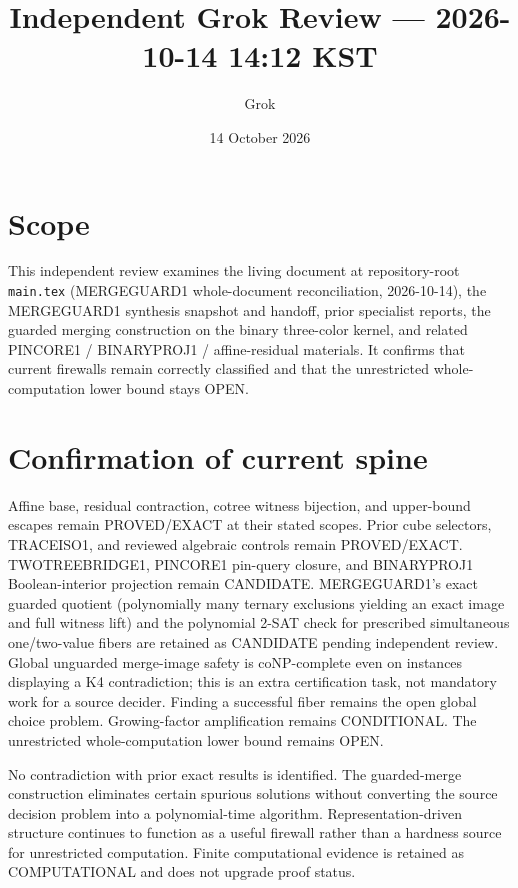 \documentclass[11pt]{article}
\title{Independent Grok Review --- 2026-10-14 14:12 KST}
\author{Grok}
\date{14 October 2026}
\begin{document}
\maketitle

\begin{center}
\end{center}

\section{Scope}
This independent review examines the living document at repository-root \texttt{main.tex} (MERGEGUARD1 whole-document reconciliation, 2026-10-14), the MERGEGUARD1 synthesis snapshot and handoff, prior specialist reports, the guarded merging construction on the binary three-color kernel, and related PINCORE1 / BINARYPROJ1 / affine-residual materials. It confirms that current firewalls remain correctly classified and that the unrestricted whole-computation lower bound stays OPEN.

\section{Confirmation of current spine}
Affine base, residual contraction, cotree witness bijection, and upper-bound escapes remain PROVED/EXACT at their stated scopes. Prior cube selectors, TRACEISO1, and reviewed algebraic controls remain PROVED/EXACT. TWOTREEBRIDGE1, PINCORE1 pin-query closure, and BINARYPROJ1 Boolean-interior projection remain CANDIDATE. MERGEGUARD1's exact guarded quotient (polynomially many ternary exclusions yielding an exact image and full witness lift) and the polynomial 2-SAT check for prescribed simultaneous one/two-value fibers are retained as CANDIDATE pending independent review. Global unguarded merge-image safety is coNP-complete even on instances displaying a K4 contradiction; this is an extra certification task, not mandatory work for a source decider. Finding a successful fiber remains the open global choice problem. Growing-factor amplification remains CONDITIONAL. The unrestricted whole-computation lower bound remains OPEN.

No contradiction with prior exact results is identified. The guarded-merge construction eliminates certain spurious solutions without converting the source decision problem into a polynomial-time algorithm. Representation-driven structure continues to function as a useful firewall rather than a hardness source for unrestricted computation. Finite computational evidence is retained as COMPUTATIONAL and does not upgrade proof status.
\end{document}
